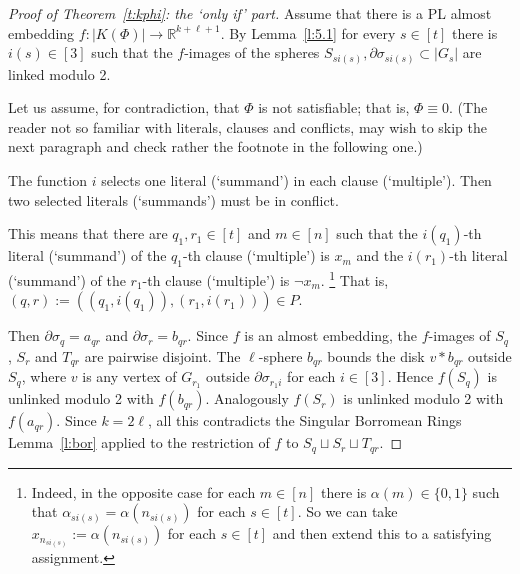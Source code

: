 \documentclass[runningheads]{llncs}
\theoremstyle{remark}
\theoremstyle{definition}
\newcommand{\R}{\mathbb{R}}
\begin{document}
{\begin{proof}[Proof of Theorem~\ref{t:kphi}: the `only if' part]
Assume that there is a PL almost embedding $f:|K(\Phi)|\to \R^{k +\ell + 1}$.
By Lemma~\ref{l:5.1} for every $s\in[t]$ there is $i(s)\in[3]$ such that
the $f$-images of the spheres  $S_{si(s)},\partial\sigma_{si(s)}\subset |G_s|$ are linked modulo 2.

Let us assume, for contradiction, that $\Phi$ is not satisfiable; that is,
  $\Phi \equiv 0$. (The reader not so familiar with literals, clauses and conflicts,
may wish to skip the next paragraph and check rather the footnote in the following one.)

  The function $i$ selects one literal (`summand') in each clause (`multiple').
  Then two selected literals (`summands') must be in conflict.

This means that there are $q_1,r_1\in[t]$ and $m\in[n]$ such that the $i(q_1)$-th literal
  (`summand') of the $q_1$-th clause (`multiple') is $x_m$ and the $i(r_1)$-th literal
  (`summand') of the $r_1$-th clause (`multiple') is $\neg x_m$.%
\footnote{Indeed, in the opposite
  case for each $m\in [n]$ there is $\alpha(m)\in\{0,1\}$
  such that $\alpha_{si(s)}=\alpha(n_{si(s)})$ for each $s\in[t]$.
  So we can take $x_{n_{si(s)}}:=\alpha(n_{si(s)})$  for each $s\in[t]$ and
  then extend this to a satisfying assignment.}
That is, $(q,r):=((q_1,i(q_1)),(r_1,i(r_1)))\in P$.

%

Then $\partial\sigma_q=a_{qr}$ and $\partial\sigma_r=b_{qr}$.
Since $f$ is an almost embedding, the $f$-images of  $S_q$, $S_r$ and $T_{qr}$  are pairwise disjoint.
The $\ell$-sphere $b_{qr}$ bounds the disk $v*b_{qr}$ outside $S_q$, where $v$ is any vertex of $G_{r_1}$ outside $\partial \sigma_{r_1i}$ for each $i \in [3]$.
Hence $f(S_q)$ is unlinked modulo 2 with $f(b_{qr})$.
Analogously $f(S_r)$ is unlinked modulo 2 with $f(a_{qr})$.
Since $k=2\ell$, all this contradicts the Singular Borromean Rings Lemma~\ref{l:bor}
applied to the restriction of $f$ to $S_q\sqcup S_r\sqcup T_{qr}$.
\end{proof}


}
\end{document}
